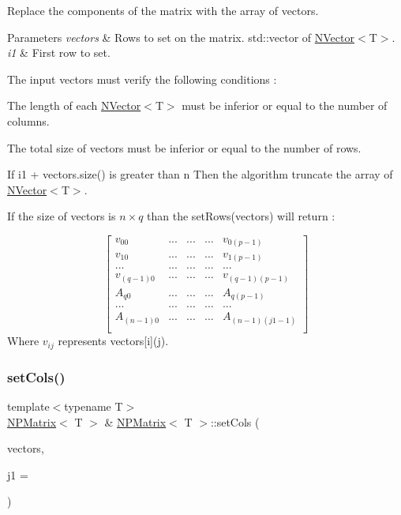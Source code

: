 Replace the components of the matrix with the array of vectors. 


\begin{DoxyParams}{Parameters}
{\em vectors} & Rows to set on the matrix. {\ttfamily std\+::vector} of {\ttfamily \mbox{\hyperlink{class_n_vector}{N\+Vector}}$<$T$>$}.\\
\hline
{\em i1} & First row to set.\\
\hline
\end{DoxyParams}
The input {\ttfamily vectors} must verify the following conditions \+:
\begin{DoxyItemize}
\item The length of each {\ttfamily \mbox{\hyperlink{class_n_vector}{N\+Vector}}$<$T$>$} must be inferior or equal to the number of columns.
\item The total size of vectors must be inferior or equal to the number of rows.
\end{DoxyItemize}

If {\ttfamily i1 + vectors.\+size()} is greater than {\ttfamily n} Then the algorithm truncate the array of {\ttfamily \mbox{\hyperlink{class_n_vector}{N\+Vector}}$<$T$>$}.

If the size of {\ttfamily vectors} is $ n \times q $ than the {\ttfamily set\+Rows(vectors)} will return \+:

\[ \begin{bmatrix} v_{00} & ... & ... & ... & v_{0(p-1)} \\ v_{10} & ... & ... & ... & v_{1(p-1)} \\ ... & ... & ... & ... & ... \\ v_{(q-1)0} & ... & ... & ... & v_{(q-1)(p-1)} \\ A_{q0} & ... & ... & ... & A_{q(p-1)} \\ ... & ... & ... & ... & ... \\ A_{(n-1)0} & ... & ... & ... & A_{(n-1)(j1 - 1)} \\ \end{bmatrix} \] Where $ v_{ij} $ represents {\ttfamily vectors\mbox{[}i\mbox{]}(j)}. \mbox{\label{class_n_p_matrix_a3e3f383b3092d70144e1178da15c5376}} 
\subsubsection{\texorpdfstring{setCols()}{setCols()}}
{\footnotesize\ttfamily template$<$typename T$>$ \\
\mbox{\hyperlink{class_n_p_matrix}{N\+P\+Matrix}}$<$ T $>$ \& \mbox{\hyperlink{class_n_p_matrix}{N\+P\+Matrix}}$<$ T $>$\+::set\+Cols (\begin{DoxyParamCaption}\item[{const std\+::vector$<$ \mbox{\hyperlink{class_n_vector}{N\+Vector}}$<$ T $>$$>$ \&}]{vectors,  }\item[{\mbox{\hyperlink{typedef_8h_a1b140a2034db3f5dfe18a987745df43a}{ul\+\_\+t}}}]{j1 = {} }\end{DoxyParamCaption})}




